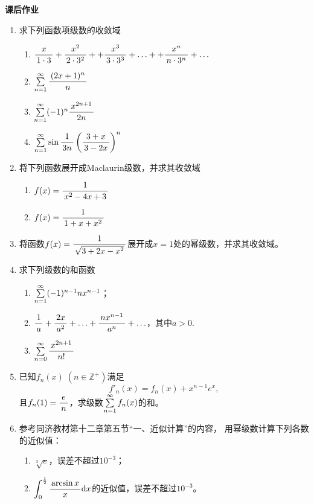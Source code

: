 \begin{ext}
	{\bf 课后作业}
	\begin{enumerate}
	  \item 求下列函数项级数的收敛域
	  \begin{enumerate}[(1)]
	    \item $\df x{1\cdot 3}+\df{x^2}{2\cdot3^2}++\df{x^3}{3\cdot3^3}
	    +\ldots++\df{x^n}{n\cdot3^n}+\ldots$
	    \item $\sumn\df{(2x+1)^n}n$
	    \item $\sumn(-1)^n\df{x^{2n+1}}{2n}$
	    \item $\sumn\sin\df 1 {3n}\left(\df{3+x}{3-2x}\right)^n$
	  \end{enumerate}
	  \item 将下列函数展开成Maclaurin级数，并求其收敛域
		\begin{enumerate}[(1)]
		  \item $f(x)=\df1{x^2-4x+3}$
		  \item $f(x)=\df 1{1+x+x^2}$
		\end{enumerate}
	  \item 将函数$f(x)=\df1{\sqrt{3+2x-x^2}}$展开成$x=1$处的幂级数，并求其收敛域。
	  \item 求下列级数的和函数
		\begin{enumerate}[(1)]
		  \item $\sumn(-1)^{n-1}nx^{n-1}$；
		  \item $\df1a+\df{2x}{a^2}+\ldots+\df{nx^{n-1}}{a^n}+\ldots$，其中$a>0$.
		  \item $\sumn[0]\df{x^{2n+1}}{n!}$
		\end{enumerate}
	  \item 已知$f_n(x)\;(n\in\mathbb{Z}^+)$满足
		$$f'_n(x)=f_n(x)+x^{n-1}e^x,$$
		且$f_n(1)=\df en$，求级数$\sumn f_n(x)$的和。
	  \item 参考{\kaishu 同济教材第十二章第五节“一、近似计算”}的内容，
	  用幂级数计算下列各数的近似值：
	  \begin{enumerate}[(1)]
	    \item $\sqrt[3]e$，误差不超过$10^{-3}$；
	    \item $\dint_0^{\frac12}\df{\arcsin x}x\d x$的近似值，误差不超过$10^{-3}$。 
	  \end{enumerate}
	\end{enumerate}
\end{ext}

